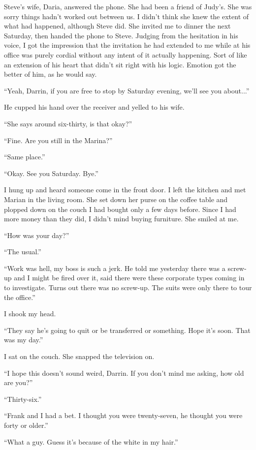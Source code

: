 Steve's wife, Daria, answered the phone. She had been a friend of
Judy's. She was sorry things hadn't worked out between us. I didn't
think she knew the extent of what had happened, although Steve did. She
invited me to dinner the next Saturday, then handed the phone to Steve.
Judging from the hesitation in his voice, I got the impression that the
invitation he had extended to me while at his office was purely cordial
without any intent of it actually happening. Sort of like an extension
of his heart that didn't sit right with his logic. Emotion got the
better of him, as he would say.

``Yeah, Darrin, if you are free to stop by Saturday evening, we'll see
you about...''

He cupped his hand over the receiver and yelled to his wife.

``She says around six-thirty, is that okay?''

``Fine. Are you still in the Marina?''

``Same place.''

``Okay. See you Saturday. Bye.''

I hung up and heard someone come in the front door. I left the kitchen
and met Marian in the living room. She set down her purse on the coffee
table and plopped down on the couch I had bought only a few days before.
Since I had more money than they did, I didn't mind buying furniture.
She smiled at me.

``How was your day?''

``The usual.''

``Work was hell, my boss is such a jerk. He told me yesterday there was
a screw-up and I might be fired over it, said there were these corporate
types coming in to investigate. Turns out there was no screw-up. The
suits were only there to tour the office.''

I shook my head.

``They say he's going to quit or be transferred or something. Hope it's
soon. That was my day.''

I sat on the couch. She snapped the television on.

``I hope this doesn't sound weird, Darrin. If you don't mind me asking,
how old are you?''

``Thirty-six.''

``Frank and I had a bet. I thought you were twenty-seven, he thought you
were forty or older.''

``What a guy. Guess it's because of the white in my hair.''

